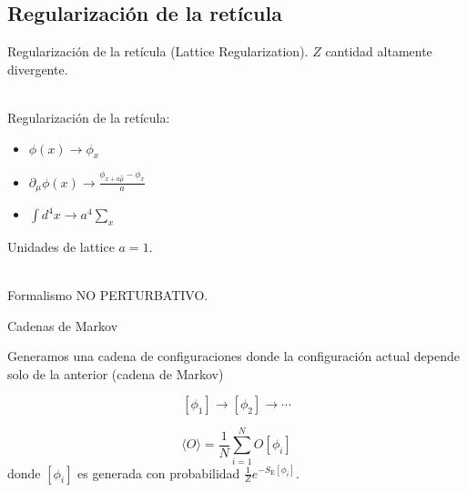 \documentclass[11pt]{beamer}
\begin{document}
\subsection{Regularización de la retícula}
\begin{frame}{Regularización de la retícula (Lattice Regularization).}
    $Z$ cantidad altamente divergente.\\~
    
    Regularización de la retícula: %
    
    \begin{center}
    \end{center}
    \begin{itemize}
    		\item $\phi(x) \to \phi_x$
         \item $\displaystyle\partial_\mu\phi(x) \to \frac{\phi_{x + a\hat{\mu}} - \phi_x}{a}$
         \item $\displaystyle\int d^4x \to a^4\sum_{x}$
    \end{itemize}
    
    Unidades de lattice $a = 1$. \\~
    
    Formalismo NO PERTURBATIVO.
\end{frame}

\begin{frame}{Cadenas de Markov}

    Generamos una cadena de configuraciones donde la configuración actual depende solo de la anterior (cadena de Markov)
    
    $$ [\phi_1] \to [\phi_2] \to \cdots$$

    $$\langle O \rangle = \frac{1}{N}\sum_{i=1}^N O[\phi_i]$$
    donde $[\phi_i]$ es generada con probabilidad $\frac{1}{Z}e^{-S_{\text{E}}[\phi_i]}$.
\end{frame}
\end{document}
